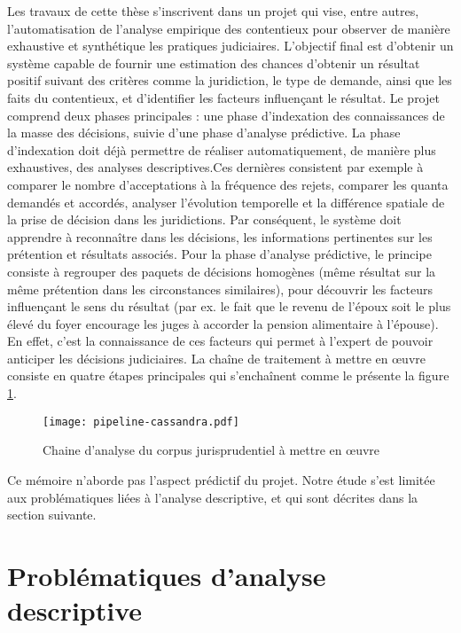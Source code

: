 Les travaux de cette thèse s'inscrivent dans un projet qui vise, entre autres, l'automatisation de l'analyse empirique des contentieux pour observer de manière exhaustive et synthétique les pratiques judiciaires. L'objectif final est d'obtenir un système capable de fournir une estimation des chances d'obtenir un résultat positif suivant des critères comme la juridiction, le type de demande, ainsi que les faits du contentieux, et d'identifier les facteurs influençant le résultat. Le projet comprend deux phases principales : une phase d'indexation des connaissances de la masse des décisions, suivie d'une phase d'analyse prédictive. La phase d'indexation doit déjà permettre de réaliser automatiquement, de manière plus exhaustives, des analyses descriptives.Ces dernières consistent par exemple à comparer le nombre d'acceptations à la fréquence des rejets, comparer les quanta demandés et accordés, analyser l'évolution temporelle et la différence spatiale de la prise de décision dans les juridictions. Par conséquent, le système doit apprendre à reconnaître dans les décisions, les informations pertinentes sur les prétention et résultats associés. Pour la phase d'analyse prédictive, le principe consiste à regrouper des paquets de décisions homogènes (même résultat sur la même prétention dans les circonstances similaires), pour découvrir les facteurs influençant le sens du résultat (par ex. le fait que \og le revenu de l'époux soit le plus élevé du foyer\fg{} encourage les juges à accorder la pension alimentaire à l'épouse). En effet, c'est la connaissance de ces facteurs qui permet à l'expert de pouvoir anticiper les décisions judiciaires. La chaîne de traitement à mettre en \oe uvre consiste en quatre étapes principales qui s'enchaînent comme le présente la figure \ref{fig:intro:pipeline-globale}. 
\begin{figure}
	\texttt{[image: pipeline-cassandra.pdf]}
	\caption{Chaine d'analyse du corpus jurisprudentiel à mettre en \oe uvre} \label{fig:intro:pipeline-globale}
\end{figure} 

Ce mémoire n'aborde pas l'aspect prédictif du projet. Notre étude s'est limitée aux problématiques liées à l'analyse descriptive, et qui sont décrites dans la section suivante.

\section{Problématiques d'analyse descriptive}
\label{sec:intro:probleme}

